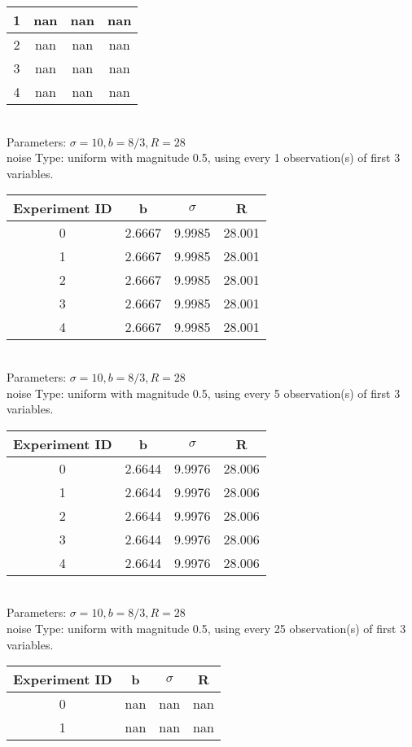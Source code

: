 \begin{multicols}{3}
\begin{tabular}{cccc}
 1 & nan & nan & nan\\ \hline 
 2 & nan & nan & nan\\ \hline 
 3 & nan & nan & nan\\ \hline 
 4 & nan & nan & nan\\ \hline 
 \end{tabular}\\
Parameters: $\sigma=10, b=8/3, R=28$\\
noise Type: uniform with magnitude 0.5, using every 1 observation(s) of first 3 variables.\\
\begin{tabular}{cccc}
\hline Experiment ID & b & $\sigma$ & R \\ \hline 
0 & 2.6667 & 9.9985 & 28.001\\ \hline 
 1 & 2.6667 & 9.9985 & 28.001\\ \hline 
 2 & 2.6667 & 9.9985 & 28.001\\ \hline 
 3 & 2.6667 & 9.9985 & 28.001\\ \hline 
 4 & 2.6667 & 9.9985 & 28.001\\ \hline 
 \end{tabular}\\
Parameters: $\sigma=10, b=8/3, R=28$\\
noise Type: uniform with magnitude 0.5, using every 5 observation(s) of first 3 variables.\\
\begin{tabular}{cccc}
\hline Experiment ID & b & $\sigma$ & R \\ \hline 
0 & 2.6644 & 9.9976 & 28.006\\ \hline 
 1 & 2.6644 & 9.9976 & 28.006\\ \hline 
 2 & 2.6644 & 9.9976 & 28.006\\ \hline 
 3 & 2.6644 & 9.9976 & 28.006\\ \hline 
 4 & 2.6644 & 9.9976 & 28.006\\ \hline 
 \end{tabular}\\
Parameters: $\sigma=10, b=8/3, R=28$\\
noise Type: uniform with magnitude 0.5, using every 25 observation(s) of first 3 variables.\\
\begin{tabular}{cccc}
\hline Experiment ID & b & $\sigma$ & R \\ \hline 
0 & nan & nan & nan\\ \hline 
 1 & nan & nan & nan\\ \hline 

\end{tabular}
\end{multicols}
